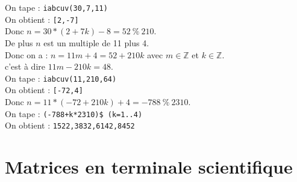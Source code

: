 \documentclass[a4paper,11pt]{book}
\newcommand{\Z}{{\mathbb{Z}}}
\begin{document}
On tape : {\tt iabcuv(30,7,11)}\\
On obtient : {\tt [2,-7]}\\
Donc $n=30*(2+7k)-8=52\ \%\ 210$.\\
De plus $n$ est un multiple de 11 plus 4.\\
Donc on a : $n=11m+4=52+210k$ avec $m\in \Z$ et $k\in \Z$.\\
c'est \`a dire $11m-210k=48$.\\
On tape : {\tt iabcuv(11,210,64)}\\
On obtient : {\tt [-72,4]}\\
Donc $n=11*(-72+210k)+4=-788\ \%\ 2310$.\\
On tape : {\tt (-788+k*2310)\$ (k=1..4)}\\
On obtient : {\tt 1522,3832,6142,8452}
\chapter{Matrices en terminale scientifique}
\end{document}
